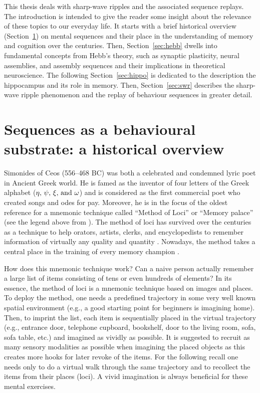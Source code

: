   This thesis deals with sharp-wave ripples and the associated sequence
  replays. The introduction is intended to give the reader some insight about
  the relevance of these topics to our everyday life. It starts with a brief
  historical overview (Section~\ref{sec:seqs}) on mental sequences and their
  place in the understanding of memory and cognition over the centuries. Then,
  Section~\ref{sec:hebb} dwells into fundamental concepts from Hebb's theory,
  such as synaptic plasticity, neural assemblies, and assembly sequences and
  their implications in theoretical neuroscience. The following
  Section~\ref{sec:hippo} is dedicated to the description the hippocampus and
  its role in memory. Then, Section~\ref{sec:swr} describes the sharp-wave
  ripple phenomenon and the replay of behaviour sequences in greater detail.

\section{Sequences as a behavioural substrate: a historical overview}
\label{sec:seqs}
  Simonides of Ceos (556--468 BC) was both a celebrated and condemned lyric
  poet in Ancient Greek world. He is famed as the inventor of four letters of the
  Greek alphabet ($\eta, \, \psi, \, \xi,\,{\rm and } \,\, \omega$) and is
  considered as the first commercial poet who created songs and odes for pay.
  Moreover, he is in the focus of the oldest reference \citep{Rhetorica} for a
  mnemonic technique called ``Method of Loci'' or ``Memory palace'' (see the legend
  above from \cite{Cicero}). The method of loci has survived over the centuries
  as a technique to help orators, artists, clerks, and encyclopedists to
  remember information of virtually any quality and quantity \citep{Yates66}.
  Nowadays, the method takes a central place in the training of every memory
  champion \citep{Foer2011}.
  
  How does this mnemonic technique work? Can a naive person actually remember a
  large list of items consisting of tens or even hundreds of elements? In its
  essence, the method of loci is a mnemonic technique based on images and
  places. To deploy the method, one needs a predefined trajectory in some very
  well known spatial environment (e.g., a good starting point for beginners is
  imagining home). Then, to imprint the list, each item is sequentially placed
  in the virtual trajectory (e.g., entrance door, telephone cupboard,
  bookshelf, door to the living room, sofa, sofa table, etc.) and imagined as
  vividly as possible. It is suggested to recruit as many sensory modalities as
  possible when imagining the placed objects as this creates more hooks for
  later revoke of the items. For the following recall one needs only to do a
  virtual walk through the same trajectory and to recollect the items from
  their places (loci). A vivid imagination is always beneficial for these
  mental exercises.

